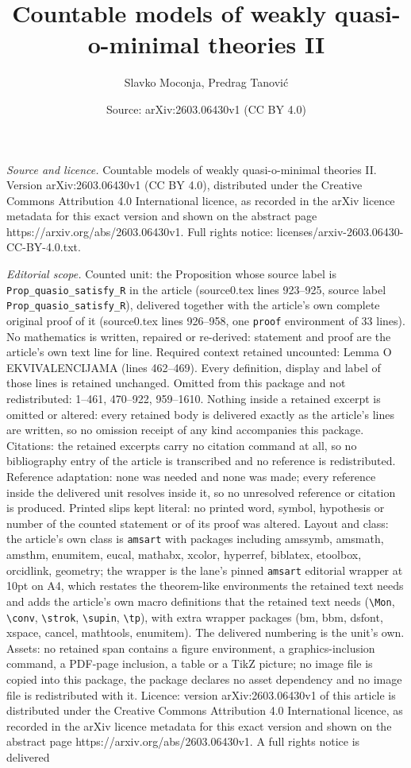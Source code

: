\documentclass[10pt,a4paper]{amsart}
\title[Countable models of weakly quasi-o-minimal theories II]{Countable models of weakly quasi-o-minimal theories II}
\author{Slavko Moconja, Predrag Tanovi\'c}
\date{Source: arXiv:2603.06430v1 (CC BY 4.0)}
\begin{document}
\maketitle

\noindent\emph{Source and licence.} Countable models of weakly quasi-o-minimal theories II. Version arXiv:2603.06430v1 (CC BY 4.0), distributed under the Creative Commons Attribution 4.0 International licence, as recorded in the arXiv licence metadata for this exact version and shown on the abstract page https://arxiv.org/abs/2603.06430v1. Full rights notice: licenses/arxiv-2603.06430-CC-BY-4.0.txt.\par\smallskip

\noindent\textit{Editorial scope.} Counted unit: the Proposition whose source label is \texttt{Prop\_quasio\_satisfy\_R} in the article (source0.tex lines 923--925, source label \texttt{Prop\_quasio\_satisfy\_R}), delivered together with the article's own complete original proof of it (source0.tex lines 926--958, one \texttt{proof} environment of 33 lines). No mathematics is written, repaired or re-derived: statement and proof are the article's own text line for line. Required context retained uncounted: Lemma O EKVIVALENCIJAMA (lines 462--469). Every definition, display and label of those lines is retained unchanged. Omitted from this package and not redistributed: 1--461, 470--922, 959--1610. Nothing inside a retained excerpt is omitted or altered: every retained body is delivered exactly as the article's lines are written, so no omission receipt of any kind accompanies this package. Citations: the retained excerpts carry no citation command at all, so no bibliography entry of the article is transcribed and no reference is redistributed. Reference adaptation: none was needed and none was made; every reference inside the delivered unit resolves inside it, so no unresolved reference or citation is produced. Printed slips kept literal: no printed word, symbol, hypothesis or number of the counted statement or of its proof was altered. Layout and class: the article's own class is \texttt{amsart} with packages including amssymb, amsmath, amsthm, enumitem, eucal, mathabx, xcolor, hyperref, biblatex, etoolbox, orcidlink, geometry; the wrapper is the lane's pinned \texttt{amsart} editorial wrapper at 10pt on A4, which restates the theorem-like environments the retained text needs and adds the article's own macro definitions that the retained text needs (\texttt{\textbackslash Mon}, \texttt{\textbackslash conv}, \texttt{\textbackslash strok}, \texttt{\textbackslash supin}, \texttt{\textbackslash tp}), with extra wrapper packages (bm, bbm, dsfont, xspace, cancel, mathtools, enumitem). The delivered numbering is the unit's own. Assets: no retained span contains a figure environment, a graphics-inclusion command, a PDF-page inclusion, a table or a TikZ picture; no image file is copied into this package, the package declares no asset dependency and no image file is redistributed with it. Licence: version arXiv:2603.06430v1 of this article is distributed under the Creative Commons Attribution 4.0 International licence, as recorded in the arXiv licence metadata for this exact version and shown on the abstract page https://arxiv.org/abs/2603.06430v1. A full rights notice is delivered 
\end{document}
